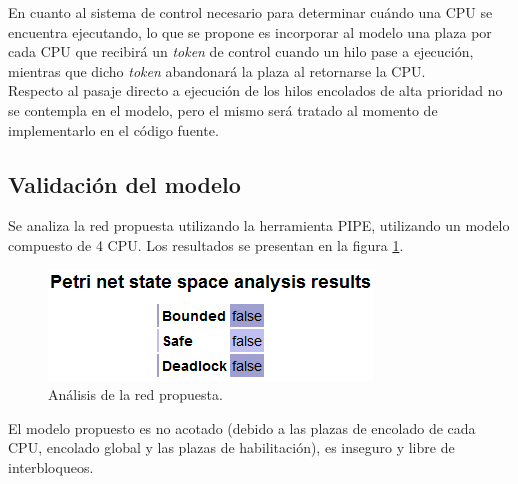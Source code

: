 \documentclass[a4paper]{book}
\begin{document}
En cuanto al sistema de control necesario para determinar cu\'ando una CPU se encuentra ejecutando, lo que se propone es incorporar al modelo una plaza por cada CPU que recibir\'a un \emph{token} de control cuando un hilo pase a ejecuci\'on, mientras que dicho \emph{token} abandonar\'a la plaza al retornarse la CPU.\\

Respecto al pasaje directo a ejecuci\'on de los hilos encolados de alta prioridad no se contempla en el modelo, pero el mismo ser\'a tratado al momento de implementarlo en el c\'odigo fuente.

\subsection{Validaci\'on del modelo}
Se analiza la red propuesta utilizando la herramienta PIPE, utilizando un modelo compuesto de 4 CPU. Los resultados se presentan en la figura \ref{Fig:validacion12}.

\begin{figure} [H]
	\begin{center}
        \includegraphics[scale=0.7]{./imagenes/it12validacion.png}
		\caption{An\'alisis de la red propuesta.}
		\label{Fig:validacion12}
	\end{center}
\end{figure}

El modelo propuesto es no acotado (debido a las plazas de encolado de cada CPU, encolado global y las plazas de habilitaci\'on), es inseguro y libre de interbloqueos.
\end{document}

